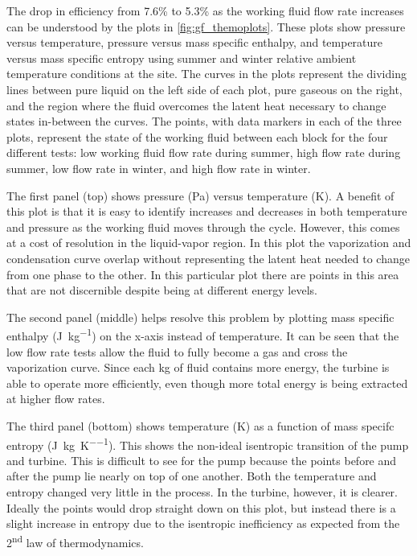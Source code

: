 The drop in efficiency from 7.6\% to 5.3\% as the working fluid flow rate increases can be understood by the plots in \autoref{fig:gf_themoplots}. These plots show pressure versus temperature, pressure versus mass specific enthalpy, and temperature versus mass specific entropy using summer and winter relative ambient temperature conditions at the site. The curves in the plots represent the dividing lines between pure liquid on the left side of each plot, pure gaseous on the right, and the region where the fluid overcomes the latent heat necessary to change states in-between the curves. The points, with data markers in each of the three plots, represent the state of the working fluid between each block for the four different tests: low working fluid flow rate during summer, high flow rate during summer, low flow rate in winter, and high flow rate in winter. 


The first panel (top) shows pressure (\si{\pascal}) versus temperature (\si{\kelvin}). A benefit of this plot is that it is easy to identify increases and decreases in both temperature and pressure as the working fluid moves through the cycle. However, this comes at a cost of resolution in the liquid-vapor region. In this plot the vaporization and condensation curve overlap without representing the latent heat needed to change from one phase to the other. In this particular plot there are points in this area that are not discernible despite being at different energy levels. 

The second panel (middle) helps resolve this problem by plotting mass specific enthalpy (\si[per-mode=symbol-or-fraction]{\joule\per\kilogram}) on the x-axis instead of temperature. It can be seen that the low flow rate tests allow the fluid to fully become a gas and cross the vaporization curve. Since each \si{\kilogram} of fluid contains more energy, the turbine is able to operate more efficiently, even though more total energy is being extracted at higher flow rates.

The third panel (bottom) shows temperature (\si{\kelvin}) as a function of mass specifc entropy (\si[per-mode=symbol-or-fraction]{\joule\per\kilogram\per\kelvin}). This shows the non-ideal isentropic transition of the pump and turbine. This is difficult to see for the pump because the points before and after the pump lie nearly on top of one another. Both the temperature and entropy changed very little in the process. In the turbine, however, it is clearer. Ideally the points would drop straight down on this plot, but instead there is a slight increase in entropy due to the isentropic inefficiency as expected from the 2\textsuperscript{nd} law of thermodynamics. 

